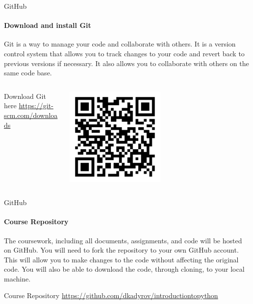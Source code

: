 \documentclass[
    aspectratio=169, 
    usepdftitle=false, 
    xcolor={dvipsnames},
    hyperref={
        colorlinks,
        linkcolor=black,
        urlcolor=blue}
    ]{beamer}
\begin{document}
\begin{frame}{GitHub}
    \framesubtitle{Download and install Git}

    Git is a way to manage your code and collaborate with others. It is a version control system that allows you to track changes to your code and revert back to previous versions if necessary. It also allows you to collaborate with others on the same code base.

    \begin{columns}
        \begin{column}{0.5\textwidth}
            \begin{block}{Download Git here}
                \url{https://git-scm.com/downloads}
            \end{block}
        \end{column}
        \begin{column}{0.5\textwidth}  %
            \begin{center}
             \includegraphics[width=0.5\textwidth]{qr-code.pdf}
             \end{center}
        \end{column}
    \end{columns}
\end{frame}

\begin{frame}{GitHub}
    \framesubtitle{Course Repository}

    The coursework, including all documents, assignments, and code will be hosted on GitHub. You will need to fork the repository to your own GitHub account. This will allow you to make changes to the code without affecting the original code. You will also be able to download the code, through cloning, to your local machine.

    \begin{block}{Course Repository}
        \url{https://github.com/dkadyrov/introductiontopython}
    \end{block}
    
\end{frame}
\end{document}
